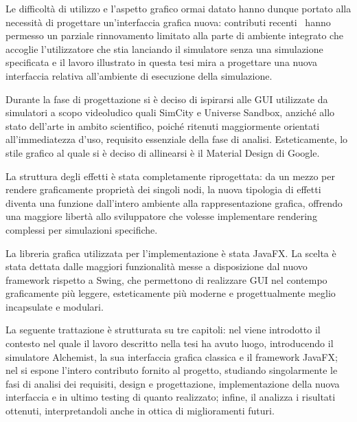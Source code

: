     Le difficoltà di utilizzo e l'aspetto grafico ormai datato hanno dunque portato alla necessità di progettare un'interfaccia grafica nuova: contributi recenti~\cite{casadio} hanno permesso un parziale rinnovamento limitato alla parte di ambiente integrato che accoglie l'utilizzatore che stia lanciando il simulatore senza una simulazione specificata e il lavoro illustrato in questa tesi mira a progettare una nuova interfaccia relativa all'ambiente di esecuzione della simulazione.

    Durante la fase di progettazione si è deciso di ispirarsi alle GUI utilizzate da simulatori a scopo videoludico quali SimCity e Universe Sandbox, anziché allo stato dell'arte in ambito scientifico, poiché ritenuti maggiormente orientati all'immediatezza d'uso, requisito essenziale della fase di analisi.
    Esteticamente, lo stile grafico al quale si è deciso di allinearsi è il Material Design di Google.

    La struttura degli effetti è stata completamente riprogettata:
    da un mezzo per rendere graficamente proprietà dei singoli nodi, la nuova tipologia di effetti diventa una funzione dall'intero ambiente alla rappresentazione grafica, offrendo una maggiore libertà allo sviluppatore che volesse implementare rendering complessi per simulazioni specifiche.

    La libreria grafica utilizzata per l'implementazione è stata JavaFX.
    La scelta è stata dettata dalle maggiori funzionalità messe a disposizione dal nuovo framework rispetto a Swing, che permettono di realizzare GUI nel contempo graficamente più leggere, esteticamente più moderne e progettualmente meglio incapsulate e modulari.

    \bigskip

    La seguente trattazione è strutturata su tre capitoli: nel  viene introdotto il contesto nel quale il lavoro descritto nella tesi ha avuto luogo, introducendo il simulatore Alchemist, la sua interfaccia grafica classica e il framework JavaFX;
    nel  si espone l'intero contributo fornito al progetto, studiando singolarmente le fasi di analisi dei requisiti, design e progettazione, implementazione della nuova interfaccia e in ultimo testing di quanto realizzato;
    infine, il  analizza i risultati ottenuti, interpretandoli anche in ottica di miglioramenti futuri.
